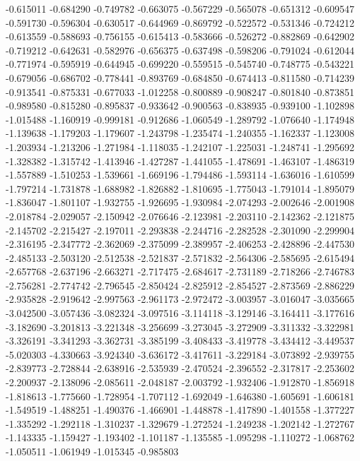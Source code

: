 -0.615011
-0.684290
-0.749782
-0.663075
-0.567229
-0.565078
-0.651312
-0.609547
-0.591730
-0.596304
-0.630517
-0.644969
-0.869792
-0.522572
-0.531346
-0.724212
-0.613559
-0.588693
-0.756155
-0.615413
-0.583666
-0.526272
-0.882869
-0.642902
-0.719212
-0.642631
-0.582976
-0.656375
-0.637498
-0.598206
-0.791024
-0.612044
-0.771974
-0.595919
-0.644945
-0.699220
-0.559515
-0.545740
-0.748775
-0.543221
-0.679056
-0.686702
-0.778441
-0.893769
-0.684850
-0.674413
-0.811580
-0.714239
-0.913541
-0.875331
-0.677033
-1.012258
-0.800889
-0.908247
-0.801840
-0.873851
-0.989580
-0.815280
-0.895837
-0.933642
-0.900563
-0.838935
-0.939100
-1.102898
-1.015488
-1.160919
-0.999181
-0.912686
-1.060549
-1.289792
-1.076640
-1.174948
-1.139638
-1.179203
-1.179607
-1.243798
-1.235474
-1.240355
-1.162337
-1.123008
-1.203934
-1.213206
-1.271984
-1.118035
-1.242107
-1.225031
-1.248741
-1.295692
-1.328382
-1.315742
-1.413946
-1.427287
-1.441055
-1.478691
-1.463107
-1.486319
-1.557889
-1.510253
-1.539661
-1.669196
-1.794486
-1.593114
-1.636016
-1.610599
-1.797214
-1.731878
-1.688982
-1.826882
-1.810695
-1.775043
-1.791014
-1.895079
-1.836047
-1.801107
-1.932755
-1.926695
-1.930984
-2.074293
-2.002646
-2.001908
-2.018784
-2.029057
-2.150942
-2.076646
-2.123981
-2.203110
-2.142362
-2.121875
-2.145702
-2.215427
-2.197011
-2.293838
-2.244716
-2.282528
-2.301090
-2.299904
-2.316195
-2.347772
-2.362069
-2.375099
-2.389957
-2.406253
-2.428896
-2.447530
-2.485133
-2.503120
-2.512538
-2.521837
-2.571832
-2.564306
-2.585695
-2.615494
-2.657768
-2.637196
-2.663271
-2.717475
-2.684617
-2.731189
-2.718266
-2.746783
-2.756281
-2.774742
-2.796545
-2.850424
-2.825912
-2.854527
-2.873569
-2.886229
-2.935828
-2.919642
-2.997563
-2.961173
-2.972472
-3.003957
-3.016047
-3.035665
-3.042500
-3.057436
-3.082324
-3.097516
-3.114118
-3.129146
-3.164411
-3.177616
-3.182690
-3.201813
-3.221348
-3.256699
-3.273045
-3.272909
-3.311332
-3.322981
-3.326191
-3.341293
-3.362731
-3.385199
-3.408433
-3.419778
-3.434412
-3.449537
-5.020303
-4.330663
-3.924340
-3.636172
-3.417611
-3.229184
-3.073892
-2.939755
-2.839773
-2.728844
-2.638916
-2.535939
-2.470524
-2.396552
-2.317817
-2.253602
-2.200937
-2.138096
-2.085611
-2.048187
-2.003792
-1.932406
-1.912870
-1.856918
-1.818613
-1.775660
-1.728954
-1.707112
-1.692049
-1.646380
-1.605691
-1.606181
-1.549519
-1.488251
-1.490376
-1.466901
-1.448878
-1.417890
-1.401558
-1.377227
-1.335292
-1.292118
-1.310237
-1.329679
-1.272524
-1.249238
-1.202142
-1.272767
-1.143335
-1.159427
-1.193402
-1.101187
-1.135585
-1.095298
-1.110272
-1.068762
-1.050511
-1.061949
-1.015345
-0.985803
